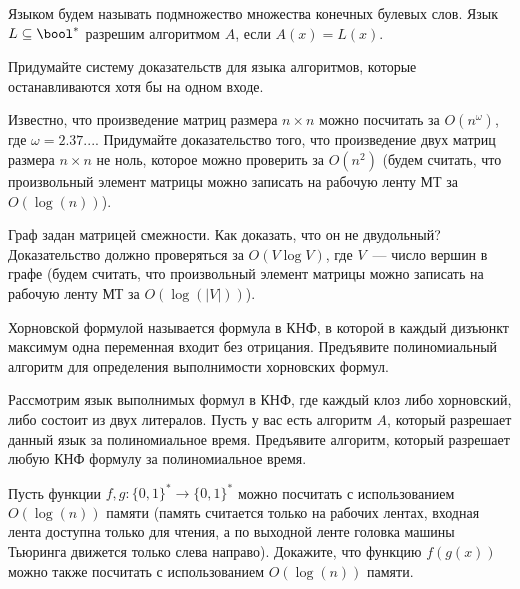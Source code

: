 
Языком будем называть подмножество множества конечных булевых слов. Язык $L \subseteq \bool^*$ разрешим алгоритмом $A$, если $A(x)
= L(x)$.

\begin{task}
	Придумайте систему доказательств для языка алгоритмов, которые останавливаются
    хотя бы на одном входе.
\end{task}

\begin{task}
    Известно, что произведение матриц размера $n \times n$ можно посчитать за $O(n^{\omega})$, где $\omega =  2.37...$. Придумайте
    доказательство того, что произведение двух матриц размера $n \times n$ не ноль, которое можно проверить за $O(n^2)$
    (будем считать, что произвольный элемент матрицы можно записать на рабочую ленту МТ за $O(\log(n))$).
\end{task}

\begin{task}
    Граф задан матрицей смежности. Как доказать, что он не двудольный? Доказательство должно проверяться за $O(V \log V)$, где
    $V$~--- число вершин в графе (будем считать, что произвольный элемент матрицы можно записать на рабочую ленту МТ за
    $O(\log(|V|))$).
\end{task}

\begin{task}
    Хорновской формулой называется формула в КНФ, в которой в каждый дизъюнкт максимум одна переменная входит без
    отрицания. Предъявите полиномиальный алгоритм для определения выполнимости хорновских формул.
\end{task}

\begin{task}
	Рассмотрим язык выполнимых формул в КНФ, где каждый клоз либо хорновский, либо состоит из двух литералов. Пусть у вас есть
    алгоритм $A$, который разрешает данный язык за полиномиальное время. Предъявите алгоритм, который разрешает любую КНФ формулу
    за полиномиальное время.
\end{task}

\begin{task}
    Пусть функции $f, g: \{0, 1\}^* \rightarrow \{0, 1\}^*$ можно посчитать с использованием $O(\log(n))$ памяти (память считается
    только на рабочих лентах, входная лента доступна только для чтения, а по выходной ленте головка машины Тьюринга движется
    только слева направо). Докажите, что функцию $f(g(x))$ можно также посчитать с использованием $O(\log(n))$ памяти.
\end{task}

